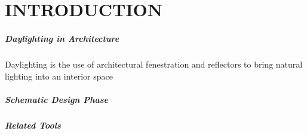
\chapter{INTRODUCTION} \label{sec:introduction}

\paragraph{Daylighting in Architecture}
Daylighting is the use of architectural fenestration and reflectors to bring natural lighting into an interior space


\paragraph{Schematic Design Phase}

\paragraph{Related Tools}
